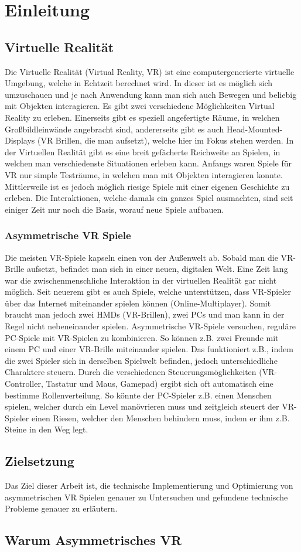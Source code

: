\chapter{Einleitung}
\label{cha:sa_Einleitung}

\section{Virtuelle Realität}
Die Virtuelle Realität (Virtual Reality, VR) ist eine computergenerierte virtuelle Umgebung, welche in Echtzeit berechnet wird. In dieser ist es möglich sich umzuschauen und je nach Anwendung kann man sich auch Bewegen und beliebig mit Objekten interagieren. Es gibt zwei verschiedene Möglichkeiten Virtual Reality zu erleben. Einerseits gibt es speziell angefertigte Räume, in welchen Großbildleinwände angebracht sind, andererseits gibt es auch Head-Mounted-Displays (VR Brillen, die man aufsetzt), welche hier im Fokus stehen werden. In der Virtuellen Realität gibt es eine breit gefächerte Reichweite an Spielen, in welchen man verschiedenste Situationen erleben kann. Anfangs waren Spiele für VR nur simple Testräume, in welchen man mit Objekten interagieren konnte. Mittlerweile ist es jedoch möglich riesige Spiele mit einer eigenen Geschichte zu erleben. Die Interaktionen, welche damals ein ganzes Spiel ausmachten, sind seit einiger Zeit nur noch die Basis, worauf neue Spiele aufbauen.

\subsection{Asymmetrische VR Spiele}
Die meisten VR-Spiele kapseln einen von der Außenwelt ab. Sobald man die VR-Brille aufsetzt, befindet man sich in einer neuen, digitalen Welt. Eine Zeit lang war die zwischenmenschliche Interaktion in der virtuellen Realität gar nicht möglich. Seit neuerem gibt es auch Spiele, welche unterstützen, dass VR-Spieler über das Internet miteinander spielen können (Online-Multiplayer). Somit braucht man jedoch zwei HMDs (VR-Brillen), zwei PCs und man kann in der Regel nicht nebeneinander spielen. Asymmetrische VR-Spiele versuchen, reguläre PC-Spiele mit VR-Spielen zu kombinieren. So können z.B. zwei Freunde mit einem PC und einer VR-Brille miteinander spielen. Das funktioniert z.B., indem die zwei Spieler sich in derselben Spielwelt befinden, jedoch unterschiedliche Charaktere steuern. Durch die verschiedenen Steuerungsmöglichkeiten (VR-Controller, Tastatur und Maus, Gamepad) ergibt sich oft automatisch eine bestimme Rollenverteilung. So könnte der PC-Spieler z.B. einen Menschen spielen, welcher durch ein Level manövrieren muss und zeitgleich steuert der VR-Spieler einen Riesen, welcher den Menschen behindern muss, indem er ihm z.B. Steine in den Weg legt.

\section{Zielsetzung}
Das Ziel dieser Arbeit ist, die technische Implementierung und Optimierung von asymmetrischen VR Spielen genauer zu Untersuchen und gefundene technische Probleme genauer zu erläutern.


\section{Warum Asymmetrisches VR}

